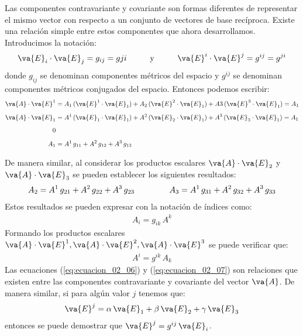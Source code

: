 Las componentes contravariante y covariante son formas diferentes de representar el mismo vector con respecto a un conjunto de vectores de base recíproca. Existe una relación simple entre estos componentes que ahora desarrollamos. Introducimos la notación:
\begin{align}
\va{E}_i \cdot \va{E}_j = g_{ij} = g{ji}  \hspace{1cm} \mbox{y} \hspace{1cm} \va{E}^i \cdot \va{E}^j = g^{ij} = g^{ji}
\label{eq:ecuacion_02_03}
\end{align}
donde $g_{ij}$ se denominan componentes métricos del espacio y $g^{ij}$ se denominan componentes métricos conjugados del espacio. Entonces podemos escribir:
\begin{align}
\begin{aligned}[b]
\va{A} \cdot \va{E}^{1} &= A_{1} \, (\va{E}^{1} \cdot \va{E}_{1}) + A_{2} \, (\va{E}^{2} \cdot \va{E}_{1}) + A{3} \, (\va{E}^{3} \cdot\va{E}_{1}) = A_{1} \\[0.5em]
\va{A} \cdot \va{E}_{1} &= A^{1} \, (\va{E}_{1} \cdot \va{E}_{1}) + A^{2} \, (\va{E}_{2} \cdot \va{E}_{1}) + A^{3} \, (\va{E}_{3} \cdot \va{E}_{1}) = A_{1} \\[0.5em]
\mbox{0} &{} \\[0.5em]
A_{1} &= A^{1} \, g_{11} + A^{2} \, g_{12} + A^{3} \, g_{13}
\end{aligned}
\label{eq:ecuacion_02_04}
\end{align}

De manera similar, al considerar los productos escalares $\va{A} \cdot \va{E}_{2}$ y $\va{A} \cdot \va{E}_{3}$ se pueden establecer los siguientes resultados:
\begin{align*}
A_{2} = A^{1} \, g_{21} + A^{2} \, g_{22} + A^{3} \, g_{23} \hspace{1.5cm} A_{3} = A^{1} \, g_{31} + A^{2} \, g_{32} + A^{3} \, g_{33}
\end{align*}
Estos resultados se pueden expresar con la notación de índices como:
\begin{align}
A_{i} = g_{ik} \, A^{k}
\label{eq:ecuacion_02_06}
\end{align}
Formando los productos escalares  $\va{A} \cdot \va{E}^{1}, \va{A} \cdot \va{E}^{2}, \va{A} \cdot \va{E}^{3}$ se puede verificar que:
\begin{align}
A^{i} = g^{ik} \, A_{k}
\label{eq:ecuacion_02_07}
\end{align}
Las ecuaciones (\ref{eq:ecuacion_02_06}) y (\ref{eq:ecuacion_02_07}) son relaciones que existen entre las componentes contravariante y covariante del vector $\va{A}$. De manera similar, si para algún valor $j$ tenemos que:
\begin{align*}
\va{E}^{j} = \alpha \, \va{E}_{1} + \beta \, \va{E}_{2} + \gamma \, \va{E}_{3}
\end{align*}
entonces se puede demostrar que $\va{E}^{j} = g^{ij} \, \va{E}_{i}$.

